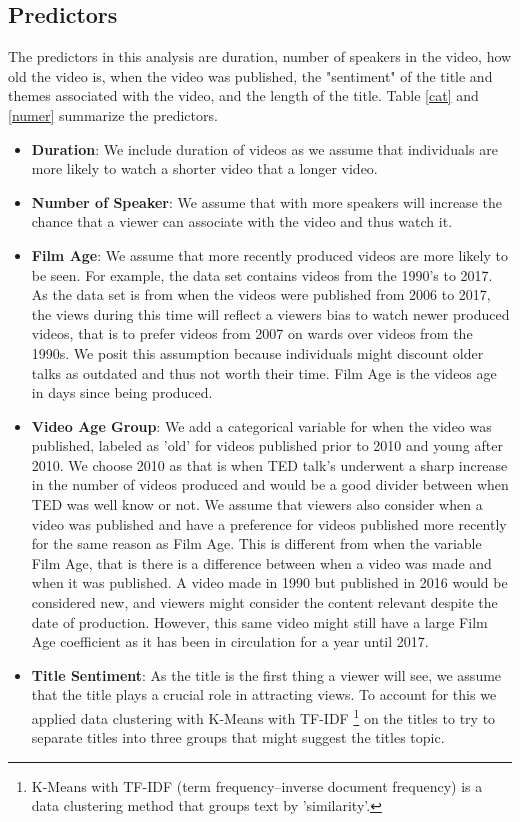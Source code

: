 \subsection{Predictors}
The predictors in this analysis are duration, number of speakers in the video, how old the video is, when the video was published, the "sentiment" of the title and themes associated with the video, and the length of the title. Table \ref{cat} and \ref{numer} summarize the predictors.
\begin{itemize}
	\item \textbf{Duration}: We include duration of videos as we assume that individuals are more likely to watch a shorter video that a longer video.
	\item \textbf{Number of Speaker}: We assume that with more speakers will increase the chance that a viewer can associate with the video and thus watch it. 
	\item \textbf{Film Age}: We assume that more recently produced videos are more likely to be seen. For example, the data set contains videos from the 1990's to 2017.  As the data set is from when the videos were published from 2006 to 2017, the views during this time will reflect a viewers bias to watch newer produced videos, that is to prefer videos from 2007 on wards over videos from the 1990s. We posit this assumption because individuals might discount older talks as outdated and thus not worth their time. Film Age is the videos age in days since being produced.
	\item \textbf{Video Age Group}: We add a categorical variable for when the video was published, labeled as 'old' for videos published prior to 2010 and young after 2010. We choose 2010 as that is when TED talk's underwent a sharp increase in the number of videos produced and would be a good divider between when TED was well know or not. We assume that viewers also consider when a video was published and have a preference for videos published more recently for the same reason as Film Age. This is different from when the variable Film Age, that is there is a difference between when a video was made and when it was published. A video made in 1990 but published in 2016 would be considered new, and viewers might consider the content relevant despite the date of production. However, this same video might still have a large Film Age coefficient as it has been in circulation for a year until 2017.  
	\item \textbf{Title Sentiment}: As the title is the first thing a viewer will see, we assume that the title plays a crucial role in attracting views. To account for this we applied data clustering with K-Means with TF-IDF \footnote{K-Means with TF-IDF (term frequency–inverse document frequency) is a data clustering method that groups text by 'similarity'.} on the titles to try to separate titles into three groups that might suggest the titles topic.

\end{itemize}
